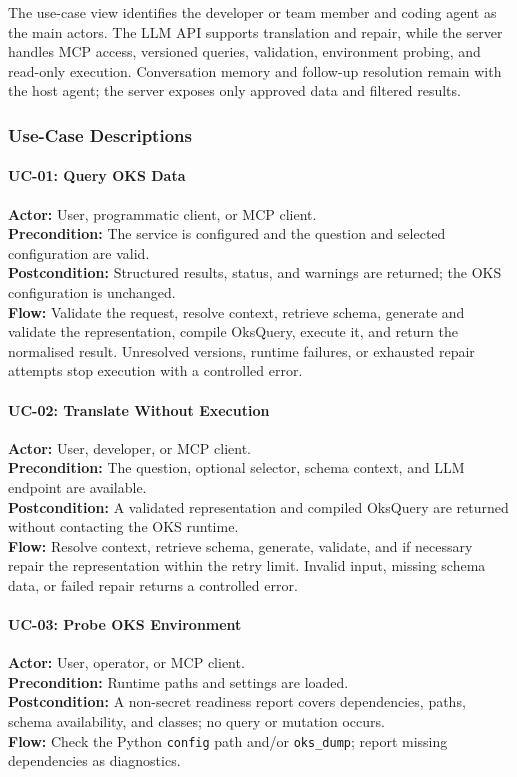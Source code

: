 \documentclass[12pt, a4paper]{report}
\begin{document}
The use-case view identifies the developer or team member and coding agent as
the main actors. The LLM API supports translation and repair, while the server
handles MCP access, versioned queries, validation, environment probing, and
read-only execution. Conversation memory and follow-up resolution remain with
the host agent; the server exposes only approved data and filtered results.

\subsubsection{Use-Case Descriptions}

\paragraph{UC-01: Query OKS Data}
\textbf{Actor:} User, programmatic client, or MCP client.\\
\textbf{Precondition:} The service is configured and the question and selected
configuration are valid.\\
\textbf{Postcondition:} Structured results, status, and warnings are returned;
the OKS configuration is unchanged.\\
\textbf{Flow:} Validate the request, resolve context, retrieve schema, generate
and validate the representation, compile OksQuery, execute it, and return the
normalised result. Unresolved versions, runtime failures, or exhausted repair
attempts stop execution with a controlled error.

\paragraph{UC-02: Translate Without Execution}
\textbf{Actor:} User, developer, or MCP client.\\
\textbf{Precondition:} The question, optional selector, schema context, and LLM
endpoint are available.\\
\textbf{Postcondition:} A validated representation and compiled OksQuery are
returned without contacting the OKS runtime.\\
\textbf{Flow:} Resolve context, retrieve schema, generate, validate, and if
necessary repair the representation within the retry limit. Invalid input,
missing schema data, or failed repair returns a controlled error.

\paragraph{UC-03: Probe OKS Environment}
\textbf{Actor:} User, operator, or MCP client.\\
\textbf{Precondition:} Runtime paths and settings are loaded.\\
\textbf{Postcondition:} A non-secret readiness report covers dependencies,
paths, schema availability, and classes; no query or mutation occurs.\\
\textbf{Flow:} Check the Python \texttt{config} path and/or
\texttt{oks\_dump}; report missing dependencies as diagnostics.
\end{document}
